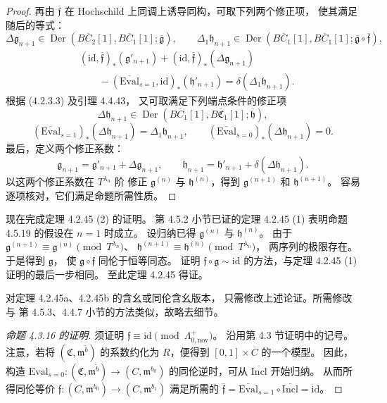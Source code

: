 \begin{proof}
再由 $\overline{\mathfrak f}$ 在 Hochschild
上同调上诱导同构，可取下列两个修正项，
使其满足随后的等式：
\[
 \Delta\mathfrak g_{n+1}
 \in\operatorname{Der}
 (B\overline C_2[1],B\overline C_1[1];
 \overline{\mathfrak g}),
 \qquad
 \Delta_1\mathfrak h_{n+1}
 \in\operatorname{Der}
 (B\overline C_1[1],B\overline C_1[1];
 \overline{\mathfrak g}\circ\overline{\mathfrak f}),
\]
\[
 \begin{aligned}
 &(\mathrm{id},\overline{\mathfrak f})_*
 (\mathfrak g'_{n+1})
 +(\mathrm{id},\overline{\mathfrak f})_*
 (\Delta\mathfrak g_{n+1})\\
 &\qquad
 -(\overline{\mathrm{Eval}}_{s=1},\mathrm{id})_*
 (\mathfrak h'_{n+1})
 =\delta(\Delta_1\mathfrak h_{n+1}).
 \end{aligned}
\]
\clearpage
根据 (4.2.3.3) 及引理 4.4.43，
又可取满足下列端点条件的修正项
\[
 \Delta\mathfrak h_{n+1}
 \in\operatorname{Der}
 (B\overline C_1[1],B\overline{\mathfrak C}_1[1];
 \overline{\mathfrak h}),
\]
\[
 (\overline{\mathrm{Eval}}_{s=1})_*
 (\Delta\mathfrak h_{n+1})
 =\Delta_1\mathfrak h_{n+1},
 \qquad
 (\overline{\mathrm{Eval}}_{s=0})_*
 (\Delta\mathfrak h_{n+1})=0.
\]
最后，定义两个修正系数：
\[
 \mathfrak g_{n+1}
 =\mathfrak g'_{n+1}+\Delta\mathfrak g_{n+1},
 \qquad
 \mathfrak h_{n+1}
 =\mathfrak h'_{n+1}
  +\delta(\Delta\mathfrak h_{n+1}).
\]
以这两个修正系数在 $T^{\lambda_n}$ 阶
修正 $\mathfrak g^{(n)}$ 与
$\mathfrak h^{(n)}$，得到
$\mathfrak g^{(n+1)}$ 和
$\mathfrak h^{(n+1)}$。
容易逐项核对，它们满足命题所需性质。
\end{proof}

现在完成定理 4.2.45 (2) 的证明。
第 4.5.2 小节已证的定理 4.2.45 (1)
表明命题 4.5.19 的假设在 $n=1$ 时成立。
设归纳已得
$\mathfrak g^{(n)}$ 与
$\mathfrak h^{(n)}$。
由于
$\mathfrak g^{(n+1)}
\equiv\mathfrak g^{(n)}
\pmod{T^{\lambda_n}}$、
$\mathfrak h^{(n+1)}
\equiv\mathfrak h^{(n)}
\pmod{T^{\lambda_n}}$，
两序列的极限存在。
于是得到 $\mathfrak g$，
使 $\mathfrak g\circ\mathfrak f$
同伦于恒等同态。
证明 $\mathfrak f\circ\mathfrak g\sim\mathrm{id}$
的方法，与定理 4.2.45 (1) 证明的最后一步相同。
至此定理 4.2.45 得证。

对定理 4.2.45a、4.2.45b 的含幺或同伦含幺版本，
只需修改上述论证。所需修改与
第 4.5.3、4.4.7 小节的方法类似，故略去细节。

\begin{proof}[命题 4.3.16 的证明]
须证明 $\mathfrak f\equiv\mathrm{id}
\pmod{\Lambda^+_{0,\mathrm{nov}}}$。
沿用第 4.3 节证明中的记号。
注意，若将
$(\mathfrak C,\mathfrak m^{\widetilde b})$
的系数约化为 $R$，便得到
$[0,1]\times\overline C$ 的一个模型。
因此，构造
$\mathrm{Eval}_{s=0}\colon
(\mathfrak C,\mathfrak m^{\widetilde b})
\to(C,\mathfrak m^{b_0})$
的同伦逆时，可从
$\overline{\mathrm{Incl}}$ 开始归纳。
从而所得同伦等价
$\mathfrak f\colon
(C,\mathfrak m^{b_0})
\to(C,\mathfrak m^{b_1})$
满足所需的
$\overline{\mathfrak f}
=\overline{\mathrm{Eval}}_{s=1}
\circ\overline{\mathrm{Incl}}
=\mathrm{id}$。
\end{proof}
